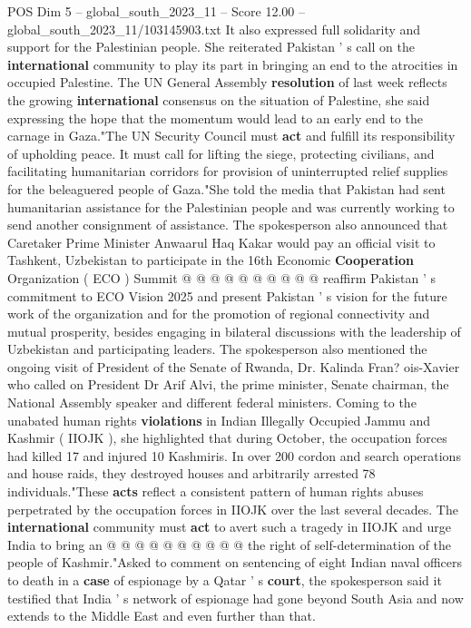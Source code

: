 \begin{textsample}{POS Dim 5 – global\_south\_2023\_11 – Score 12.00 – global\_south\_2023\_11/103145903.txt}
It also expressed full solidarity and support for the Palestinian people.
She reiterated Pakistan ' s call on the \textbf{international} community to play its part in bringing an end to the atrocities in occupied Palestine.
The UN General Assembly \textbf{resolution} of last week reflects the growing \textbf{international} consensus on the situation of Palestine, she said expressing the hope that the momentum would lead to an early end to the carnage in Gaza."The UN Security Council must \textbf{act} and fulfill its responsibility of upholding peace.
It must call for lifting the siege, protecting civilians, and facilitating humanitarian corridors for provision of uninterrupted relief supplies for the beleaguered people of Gaza."She told the media that Pakistan had sent humanitarian assistance for the Palestinian people and was currently working to send another consignment of assistance.
The spokesperson also announced that Caretaker Prime Minister Anwaarul Haq Kakar would pay an official visit to Tashkent, Uzbekistan to participate in the 16th Economic \textbf{Cooperation} Organization ( ECO ) Summit @ @ @ @ @ @ @ @ @ @ reaffirm Pakistan ' s commitment to ECO Vision 2025 and present Pakistan ' s vision for the future work of the organization and for the promotion of regional connectivity and mutual prosperity, besides engaging in bilateral discussions with the leadership of Uzbekistan and participating leaders.
The spokesperson also mentioned the ongoing visit of President of the Senate of Rwanda, Dr.
Kalinda Fran? ois-Xavier who called on President Dr Arif Alvi, the prime minister, Senate chairman, the National Assembly speaker and different federal ministers.
Coming to the unabated human rights \textbf{violations} in Indian Illegally Occupied Jammu and Kashmir ( IIOJK ), she highlighted that during October, the occupation forces had killed 17 and injured 10 Kashmiris.
In over 200 cordon and search operations and house raids, they destroyed houses and arbitrarily arrested 78 individuals."These \textbf{acts} reflect a consistent pattern of human rights abuses perpetrated by the occupation forces in IIOJK over the last several decades.
The \textbf{international} community must \textbf{act} to avert such a tragedy in IIOJK and urge India to bring an @ @ @ @ @ @ @ @ @ @ the right of self-determination of the people of Kashmir."Asked to comment on sentencing of eight Indian naval officers to death in a \textbf{case} of espionage by a Qatar ' s \textbf{court}, the spokesperson said it testified that India ' s network of espionage had gone beyond South Asia and now extends to the Middle East and even further than that.

\end{textsample}
